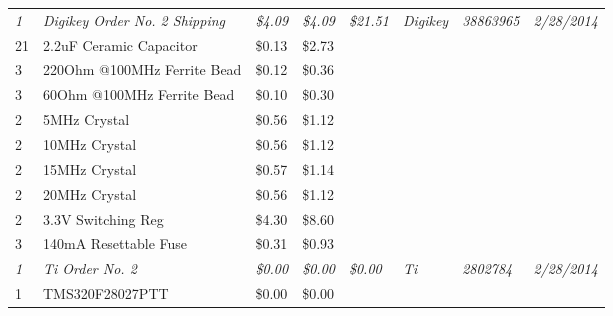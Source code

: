 \begin{table}[h]
{\begin{tabular}{llllllll}
\textit{1}   & \textit{Digikey Order No. 2 Shipping}             & \textit{\$4.09}  & \textit{\$4.09}  & \textit{\$21.51}  & \textit{Digikey}  & \textit{38863965}     & \textit{2/28/2014}  \\
21           & 2.2uF Ceramic Capacitor                           & \$0.13           & \$2.73           &                   &                   &                       &                     \\
3            & 220Ohm @100MHz Ferrite Bead                       & \$0.12           & \$0.36           &                   &                   &                       &                     \\
3            & 60Ohm @100MHz Ferrite Bead                        & \$0.10           & \$0.30           &                   &                   &                       &                     \\
2            & 5MHz Crystal                                      & \$0.56           & \$1.12           &                   &                   &                       &                     \\
2            & 10MHz Crystal                                     & \$0.56           & \$1.12           &                   &                   &                       &                     \\
2            & 15MHz Crystal                                     & \$0.57           & \$1.14           &                   &                   &                       &                     \\
2            & 20MHz Crystal                                     & \$0.56           & \$1.12           &                   &                   &                       &                     \\
2            & 3.3V Switching Reg                                & \$4.30           & \$8.60           &                   &                   &                       &                     \\
3            & 140mA Resettable Fuse                             & \$0.31           & \$0.93           &                   &                   &                       &                     \\  \hline \hline
\textit{1}   & \textit{Ti Order No. 2}                           & \textit{\$0.00}  & \textit{\$0.00}  & \textit{\$0.00}   & \textit{Ti}       & \textit{2802784}      & \textit{2/28/2014}  \\
1            & TMS320F28027PTT                                   & \$0.00           & \$0.00           &                   &                   &                       &                     \\

\end{tabular}}
\end{table}
